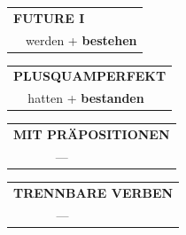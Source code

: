 \documentclass[10pt,a4paper]{revtex4-2}
\begin{document}
\begin{verbbox-acc}
\begin{tabular}{rl}
    \multicolumn{2}{l}{\textbf{FUTURE I} }\\
  &  werden + \textbf{bestehen}\\
 
  \end{tabular}
\hfill
   \begin{tabular}{rl}
      \multicolumn{2}{l}{\textbf{PLUSQUAMPERFEKT}}\\
   & hatten + \textbf{bestanden}\\
  \end{tabular}
  
 \vspace{10pt}

\begin{tabular}{lll}
\multicolumn{3}{l}{\textbf{MIT PRÄPOSITIONEN}}\\
& ---\\
\end{tabular}
\hfill
\begin{tabular}{lll}
\multicolumn{3}{l}{\textbf{TRENNBARE VERBEN}}\\
& ---\\
\end{tabular}

\vspace{-5pt}

\end{verbbox-acc}
\end{document}
